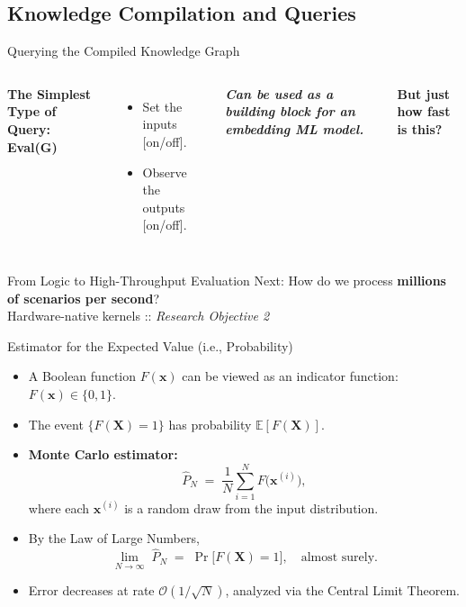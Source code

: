\subsection{Knowledge Compilation and Queries}
\begin{frame}[t]{Querying the Compiled Knowledge Graph}
  \begin{columns}
    {
      \textbf{The Simplest Type of Query: Eval(G)}\par
      \begin{itemize}
          \item {Set the inputs [on/off].}
          \item {Observe the outputs [on/off].}
      \end{itemize}\par
      \vspace{2pt}
      \tiny{\textbf{\emph{{Can be used as a building block for an embedding ML model.}}}}\par
            \vspace{10pt}
      \normalsize\textbf{But just how fast is this?}

    }
      \par %
  \end{columns}
\end{frame}

\begin{frame}{From Logic to High-Throughput Evaluation}
  \centering
  \Large Next: How do we process \textbf{millions of scenarios per second}?\\[6pt]
  \normalsize
  Hardware-native kernels :: \textit{Research Objective 2}
\end{frame}

\iffalse %
%

\begin{frame}{Estimator for the Expected Value (i.e., Probability)}
\begin{itemize}
  \item A Boolean function \(F(\mathbf{x})\) can be viewed as an indicator function: \(F(\mathbf{x}) \in \{0,1\}\).
  \item The event \(\{F(\mathbf{X})=1\}\) has probability \(\mathbb{E}[F(\mathbf{X})]\).
  \item \textbf{Monte Carlo estimator:}
    \[
      \widehat{P}_N
      \;=\;
      \frac{1}{N}\sum_{i=1}^N 
      F\!\bigl(\mathbf{x}^{(i)}\bigr),
    \]
    where each \(\mathbf{x}^{(i)}\) is a random draw from the input distribution.
  \item By the Law of Large Numbers,
    \[
      \lim_{N \to \infty}\;\widehat{P}_N
      \;=\;
      \Pr\bigl[F(\mathbf{X})=1\bigr],
      \quad \text{almost surely}.
    \]
  \item Error decreases at rate \(\mathcal{O}(1/\sqrt{N})\), analyzed via the Central Limit Theorem.
\end{itemize}
\end{frame}

